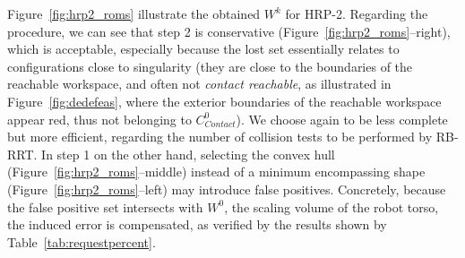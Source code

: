 \documentclass[journal]{IEEEtran}
\newcommand{\gls}[1]{\textit{#1}}
\begin{document}
Figure~\ref{fig:hrp2_roms} illustrate the obtained $W^k$ for HRP-2.
Regarding the procedure, we can see that step 2 is conservative (Figure~\ref{fig:hrp2_roms}--right), which 
is acceptable, especially because the lost set essentially relates to configurations close to singularity (they are close to the boundaries of the reachable workspace, and
often not \gls{contact reachable}, as illustrated in Figure~\ref{fig:dedefeas}, where the exterior boundaries of the reachable workspace appear
red, thus not belonging to $C_{Contact}^0$). We choose again to be less complete but more efficient, regarding the number of collision tests to be performed by RB-RRT.
In step 1 on the other hand, selecting the convex hull (Figure~\ref{fig:hrp2_roms}--middle) instead of a minimum encompassing shape (Figure~\ref{fig:hrp2_roms}--left) may introduce false positives.
Concretely, because the false positive set intersects with $W^0$, the scaling volume of the robot torso, the induced error is compensated,
as verified by the results shown by Table~\ref{tab:requestpercent}.
\end{document}
